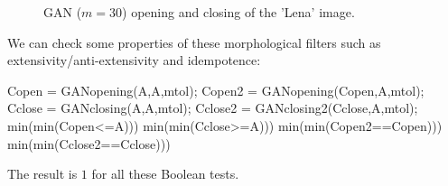 \begin{figure}[htbp]
\centering
 \hfill
  \hfill
 \caption{GAN ($m=30$) opening and closing of the 'Lena' image.}
 \label{fig:ganip:matlab:openingclosing}
\end{figure}

We can check some properties of these morphological filters such as extensivity/anti-extensivity and idempotence:

\begin{matlab}
Copen = GANopening(A,A,mtol);
Copen2 = GANopening(Copen,A,mtol);
Cclose = GANclosing(A,A,mtol);
Cclose2 = GANclosing2(Cclose,A,mtol);
min(min(Copen<=A)))
min(min(Cclose>=A)))
min(min(Copen2==Copen)))
min(min(Cclose2==Cclose)))
\end{matlab}

\noindent The result is $1$ for all these Boolean tests.
